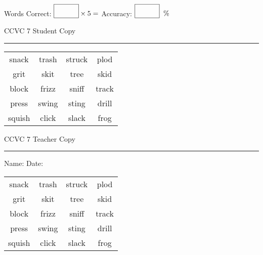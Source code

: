 \documentclass{memoir}
\begin{document}
\normalsize

Words Correct: $\fbox{\phantom{\huge 100}} \times 5 = $ Accuracy: $\fbox{\phantom{\huge 100}}\;\; \%$ 

\vfill

\newpage


\footnotesize \noindent
CCVC 7 \hfill Student Copy
\smallskip
\hrule

\Large

\setlength{\tabcolsep}{14pt}
\def\arraystretch{3}

{\selectfont


\begin{vplace}[0.5]
\begin{center}
\begin{tabular}{cccc}
snack & trash & struck & plod \\
grit      & skit & tree & skid \\
block & frizz & sniff & track       \\
press       & swing & sting & drill \\
squish & click             & slack            & frog \\
\end{tabular}
\end{center}
\end{vplace}

}

\newpage

\footnotesize \noindent
CCVC 7 \hfill Teacher Copy
\smallskip
\hrule

\normalsize

\vfill

\noindent
Name: \underline{\hspace{1.75in}} \hfill Date: \underline{\hspace{1in}}

\Large

{\selectfont


\begin{vplace}[0.5]
\begin{center}
\begin{tabular}{cccc}
snack & trash & struck & plod \\
grit      & skit & tree & skid \\
block & frizz & sniff & track       \\
press       & swing & sting & drill \\
squish & click             & slack            & frog \\
\end{tabular}
\end{center}
\end{vplace}



}
\end{document}
